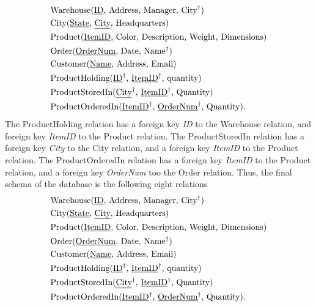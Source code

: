 \documentclass{report}
\begin{document}
    \begin{align*}
         &\text{Warehouse(\underline{ID}, Address, Manager, City$^{\dag}$)} \\
        &\text{City(\underline{State}, \underline{City}, Headquarters)} \\
        &\text{Product(\underline{ItemID}, Color, Description, Weight, Dimensions)} \\
        &\text{Order(\underline{OrderNum}, Date, Name$^{\dag}$)} \\
        &\text{Customer(\underline{Name}, Address, Email)}\\
        &\text{ProductHolding(\underline{ID}$^{\dag}$, \underline{ItemID}$^{\dag}$, quantity)} \\
        &\text{ProductStoredIn(\underline{City}$^{\dag}$, \underline{ItemID}$^{\dag}$, Quantity)} \\
        &\text{ProductOrderedIn(\underline{ItemID}$^{\dag}$, \underline{OrderNum}$^{\dag}$, Quantity)}
    .\end{align*}
    \bigbreak \noindent 
    The ProductHolding relation has a foreign key \textit{ID} to the Warehouse relation, and foreign key \textit{ItemID} to the Product relation.
    \bigbreak \noindent 
    The ProductStoredIn relation has a foreign key \textit{City} to the City relation, and a foreign key \textit{ItemID} to the Product relation.
    \bigbreak \noindent 
    The ProductOrderedIn relation has a foreign key \textit{ItemID} to the Product relation, and a foreign key \textit{OrderNum} too the Order relation. 
    \pagebreak \bigbreak \noindent 
    Thus, the final schema of the database is the following eight relations
    \bigbreak \noindent 
    \begin{align*}
         &\text{Warehouse(\underline{ID}, Address, Manager, City$^{\dag}$)} \\
         &\text{City(\underline{State}, \underline{City}, Headquarters)} \\
         &\text{Product(\underline{ItemID}, Color, Description, Weight, Dimensions)} \\
         &\text{Order(\underline{OrderNum}, Date, Name$^{\dag}$)} \\
         &\text{Customer(\underline{Name}, Address, Email)}\\
         &\text{ProductHolding(\underline{ID}$^{\dag}$, \underline{ItemID}$^{\dag}$, quantity)} \\
         &\text{ProductStoredIn(\underline{City}$^{\dag}$, \underline{ItemID}$^{\dag}$, Quantity)} \\
         &\text{ProductOrderedIn(\underline{ItemID}$^{\dag}$, \underline{OrderNum}$^{\dag}$, Quantity)}
     .\end{align*}



    
\end{document}
